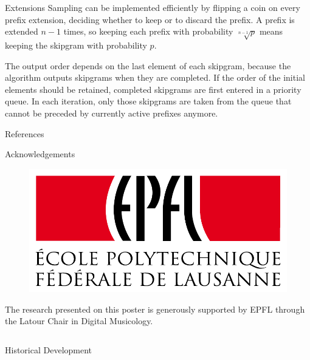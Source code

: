 \documentclass[final]{beamer}
\begin{document}
\begin{frame}[t]
\begin{minipage}[t][.56\textheight][t]{\textwidth}
\begin{columns}[t]
\begin{column}{0.3\textwidth}
\begin{block}{Extensions}
        \alert{Sampling} can be implemented efficiently
        by \alert{flipping a coin} on every prefix extension,
        deciding whether to keep or to discard the prefix.
        A prefix is extended $n-1$ times,
        so keeping each prefix with probability $\sqrt[n-1]{p}$
        means keeping the skipgram with probability $p$.

        The output order depends on the last element of each skipgram,
        because the algorithm outputs skipgrams when they are completed.
        If the \alert{order of the initial elements} should be retained,
        completed skipgrams are first entered in a \alert{priority queue}.
        In each iteration, only those skipgrams are taken from the queue
        that cannot be preceded by currently active prefixes anymore.
      \end{block}

      \begin{block}{References}
          \printbibliography
      \end{block}

      \begin{block}{Acknowledgements}

        \begin{figure}
          \includegraphics[width=.4\textwidth]{img/Logo_EPFL.pdf}
        \end{figure}

        \small
        The research presented on this poster is generously
        supported by EPFL through the Latour Chair in Digital Musicology.
      \end{block}

    \end{column}
  \end{columns}

\end{minipage}

\begin{minipage}[t][.3\textheight][t]{\textwidth}
  \begin{block}{Historical Development}


\end{block}
\end{minipage}
\end{frame}
\end{document}
